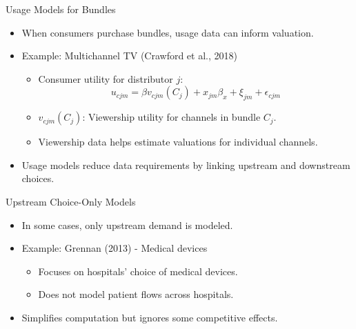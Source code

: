 \documentclass[aspectratio=169]{beamer}  %
\begin{document}
\begin{frame}{Usage Models for Bundles}
    \begin{itemize}
        \item When consumers purchase bundles, usage data can inform valuation.
        \item Example: Multichannel TV (Crawford et al., 2018)
        \begin{itemize}
            \item Consumer utility for distributor \(j\):
            \[
            u_{cjm} = \beta v_{cjm}(C_j) + x_{jm} \beta_x + \xi_{jm} + \epsilon_{cjm}
            \]
            \item \(v_{cjm}(C_j)\): Viewership utility for channels in bundle \(C_j\).
            \item Viewership data helps estimate valuations for individual channels.
        \end{itemize}
        \item Usage models reduce data requirements by linking upstream and downstream choices.
    \end{itemize}
\end{frame}

\begin{frame}{Upstream Choice-Only Models}
    \begin{itemize}
        \item In some cases, only upstream demand is modeled.
        \item Example: Grennan (2013) - Medical devices
        \begin{itemize}
            \item Focuses on hospitals' choice of medical devices.
            \item Does not model patient flows across hospitals.
        \end{itemize}
        \item Simplifies computation but ignores some competitive effects.
    \end{itemize}
\end{frame}
\end{document}

